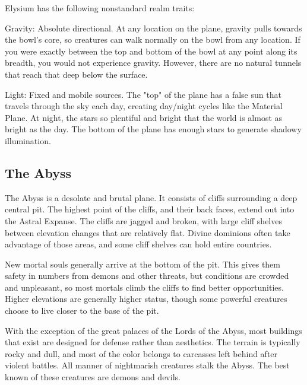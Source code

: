       Elysium has the following nonstandard realm traits:
      \begin{raggeditemize}
        \item Gravity: Absolute directional. At any location on the plane, gravity pulls towards the bowl's core, so creatures can walk normally on the bowl from any location. If you were exactly between the top and bottom of the bowl at any point along its breadth, you would not experience gravity. However, there are no natural tunnels that reach that deep below the surface.
        \item Light: Fixed and mobile sources. The "top" of the plane has a false sun that travels through the sky each day, creating day/night cycles like the Material Plane.
          At night, the stars so plentiful and bright that the world is almost as bright as the day.
          The bottom of the plane has enough stars to generate shadowy illumination.
      \end{raggeditemize}

    \subsection{The Abyss}

      The Abyss is a desolate and brutal plane.
      It consists of cliffs surrounding a deep central pit.
      The highest point of the cliffs, and their back faces, extend out into the Astral Expanse.
      The cliffs are jagged and broken, with large cliff shelves between elevation changes that are relatively flat.
      Divine dominions often take advantage of those areas, and some cliff shelves can hold entire countries.

      New mortal souls generally arrive at the bottom of the pit.
      This gives them safety in numbers from demons and other threats, but conditions are crowded and unpleasant, so most mortals climb the cliffs to find better opportunities.
      Higher elevations are generally higher status, though some powerful creatures choose to live closer to the base of the pit.

      With the exception of the great palaces of the Lords of the Abyss, most buildings that exist are designed for defense rather than aesthetics.
      The terrain is typically rocky and dull, and most of the color belongs to carcasses left behind after violent battles.
      All manner of nightmarish creatures stalk the Abyss.
      The best known of these creatures are demons and devils.

